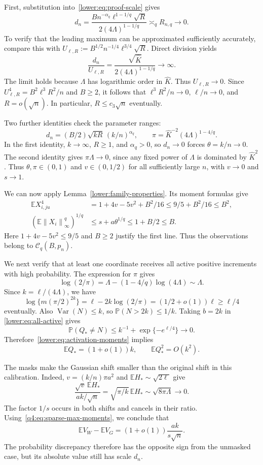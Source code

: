 \documentclass[11pt,letterpaper]{article}
\theoremstyle{remark}
\newcommand{\E}{\mathbb E}
\newcommand{\Pp}{\mathbb P}
\newcommand{\Var}{\operatorname{Var}}
\newcommand{\norm}[1]{\left\lVert#1\right\rVert}
\begin{document}
First, substitution into~\eqref{lower:eq:proof-scale} gives
\[
 d_n=\frac{B n^{-\alpha_q}\ell^{1-1/q}\sqrt R}
 {2(4\Lambda)^{1-1/q}}\asymp_q R_{n,q}\longrightarrow0.
\]
To verify that the leading maximum can be approximated sufficiently
accurately, compare this with
$U_{\ell,R}:=B^{1/2}n^{-1/4}\ell^{3/4}\sqrt R$.
Direct division yields
\[
 \frac{d_n}{U_{\ell,R}}
 =\frac{\sqrt{\widehat K}}{2(4\Lambda)^{1-1/q}}
 \longrightarrow\infty.
\]
The limit holds because $\Lambda$ has logarithmic order in
$\widehat K$. Thus $U_{\ell,R}\to0$. Since
$U_{\ell,R}^4=B^2\ell^3R^2/n$ and $B\ge2$, it follows that
$\ell^3R^2/n\to0$, $\ell/n\to0$, and $R=o(\sqrt n)$.
In particular, $R\le c_3\sqrt n$ eventually.

Two further identities check the parameter ranges:
\[
 d_n=(B/2)\sqrt{kR}\,(k/n)^{\alpha_q},\qquad
 \pi=\widehat K^{-2}(4\Lambda)^{1-4/q}.
\]
In the first identity, $k\to\infty$, $R\ge1$, and
$\alpha_q>0$, so $d_n\to0$ forces $\theta=k/n\to0$.
The second identity gives $\pi\Lambda\to0$, since any fixed
power of $\Lambda$ is dominated by $\widehat K^2$.
Thus $\theta,\pi\in(0,1)$ and $v\in(0,1/2)$ for all
sufficiently large $n$, with $v\to0$ and $s\to1$.

We can now apply Lemma~\ref{lower:family-properties}. Its moment
formulas give
\begin{align}
 \E X_{i,ju}^4
 &=1+4v-5v^2+B^2/16\le9/5+B^2/16\le B^2,
 \label{q4:eq:sparse-coordinate-moments}\\
 (\E\norm{X_i}_\infty^q)^{1/q}
 &\le s+a\theta^{1/q}\le1+B/2\le B.
 \label{q4:eq:sparse-envelope-moment}
\end{align}
Here $1+4v-5v^2\le9/5$ and $B\ge2$ justify the first line.
Thus the observations belong to $\mathcal C_q(B,p_n)$.

We next verify that at least one coordinate receives all active
positive increments with high probability. The expression for $\pi$
gives
\[
 \log(2/\pi)=\Lambda-(1-4/q)\log(4\Lambda)\sim\Lambda.
\]
Since $k=\ell/(4\Lambda)$, we have
\[
 \log\{m(\pi/2)^{2k}\}
 =\ell-2k\log(2/\pi)=(1/2+o(1))\ell\ge\ell/4
\]
eventually. Also $\Var(N)\le k$, so
$\Pp(N>2k)\le1/k$. Taking $b=2k$ in
\eqref{lower:eq:all-active} gives
\[
 \Pp(Q_*\ne N)\le k^{-1}+\exp\{-e^{\ell/4}\}\to0.
\]
Therefore~\eqref{lower:eq:activation-moments} implies
\begin{equation}
 \E Q_*=(1+o(1))k,\qquad \E Q_*^2=O(k^2).
 \label{q4:eq:sparse-max-moments}
\end{equation}

The masks make the Gaussian shift smaller than the original shift
in this calibration. Indeed, $v=(k/n)\pi a^2$ and
$\E H_*\sim\sqrt{2\ell}$ give
\[
 \frac{\sqrt v\,\E H_*}{ak/\sqrt n}
 =\sqrt{\pi/k}\,\E H_*\sim\sqrt{8\pi\Lambda}\to0.
\]
The factor $1/s$ occurs in both shifts and cancels in their ratio.
Using~\eqref{q4:eq:sparse-max-moments}, we conclude that
\begin{equation}
 \E V_W-\E V_G=(1+o(1))\frac{ak}{s\sqrt n}.
 \label{q4:eq:sparse-mean-gap}
\end{equation}
The probability discrepancy therefore has the opposite sign from
the unmasked case, but its absolute value still has scale $d_n$.
\end{document}
